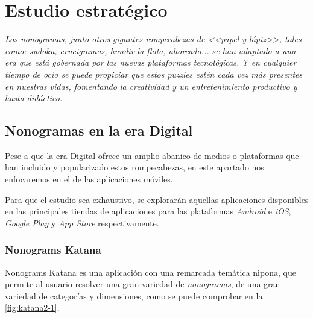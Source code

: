 \chapter{Estudio estratégico}
\textit{Los \textit{nonogramas}, junto otros gigantes rompecabezas de <<papel y lápiz>>, tales como: sudoku, crucigramas, hundir la flota, ahorcado... se han adaptado a
una era que está gobernada por las nuevas plataformas tecnológicas. Y en cualquier tiempo de ocio se puede propiciar que estos puzzles estén cada vez más presentes
en nuestras vidas, fomentando la creatividad y un entretenimiento productivo y hasta didáctico.}

\section{Nonogramas en la era Digital}

Pese a que la era Digital ofrece un amplio abanico de medios o plataformas que han incluido y popularizado estos rompecabezas, en
este apartado nos enfocaremos en el de las aplicaciones móviles.

Para que el estudio sea exhaustivo, se explorarán aquellas aplicaciones disponibles en las principales tiendas de aplicaciones para 
las plataformas \textit{Android} e \textit{iOS}, \textit{Google Play} y \textit{App Store} respectivamente.

\subsection{Nonograms Katana}
Nonograms Katana es una aplicación con una remarcada temática nipona, que permite al usuario resolver una gran variedad de \textit{nonogramas},
de una gran variedad de categorías y dimensiones, como se puede comprobar en la \autoref{fig:katana2-1}.

